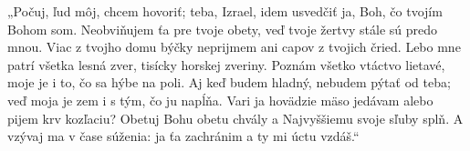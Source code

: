 „Počuj, ľud môj, chcem hovoriť;
teba, Izrael, idem usvedčiť
ja, Boh, čo tvojím Bohom som.
\versseparator
Neobviňujem ťa pre tvoje obety,
veď tvoje žertvy stále sú predo mnou.
\versseparator
Viac z tvojho domu býčky neprijmem
ani capov z tvojich čried.
\versseparator
Lebo mne patrí všetka lesná zver,
tisícky horskej zveriny.
\versseparator
Poznám všetko vtáctvo lietavé,
moje je i to, čo sa hýbe na poli.
\versseparator
Aj keď budem hladný, nebudem pýtať od teba;
veď moja je zem i s tým, čo ju napĺňa.
\versseparator
Vari ja hovädzie mäso jedávam
alebo pijem krv kozľaciu?
\versseparator
Obetuj Bohu obetu chvály
a Najvyššiemu svoje sľuby splň.
\versseparator
A vzývaj ma v čase súženia:
ja ťa zachránim a ty mi úctu vzdáš.“